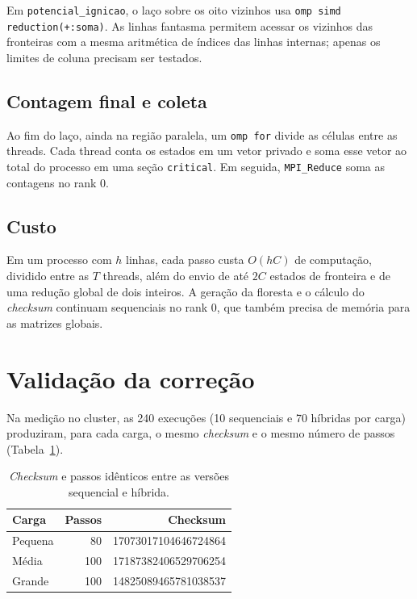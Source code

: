 \documentclass[11pt,a4paper]{article}
\begin{document}
Em \texttt{potencial\_ignicao}, o laço sobre os oito vizinhos usa
\texttt{omp simd reduction(+:soma)}. As linhas fantasma permitem acessar os
vizinhos das fronteiras com a mesma aritmética de índices das linhas
internas; apenas os limites de coluna precisam ser testados.

\subsection{Contagem final e coleta}

Ao fim do laço, ainda na região paralela, um \texttt{omp for} divide as
células entre as threads. Cada thread conta os estados em um vetor privado e
soma esse vetor ao total do processo em uma seção \texttt{critical}. Em seguida, \texttt{MPI\_Reduce} soma as contagens no rank 0.

\subsection{Custo}

Em um processo com $h$ linhas, cada passo custa $O(hC)$ de computação,
dividido entre as $T$ threads, além do envio de até $2C$ estados de
fronteira e de uma redução global de dois inteiros. A geração da floresta e
o cálculo do \emph{checksum} continuam sequenciais no rank 0, que também
precisa de memória para as matrizes globais.

\section{Validação da correção}\label{sec:validacao}

Na medição no cluster, as 240 execuções (10 sequenciais e 70 híbridas por
carga) produziram, para cada carga, o mesmo \emph{checksum} e o mesmo número
de passos (Tabela~\ref{tab:validacao}).

\begin{table}[H]
\centering
\caption{\emph{Checksum} e passos idênticos entre as versões sequencial e híbrida.}
\label{tab:validacao}
\begin{tabular}{lrr}
\toprule
\textbf{Carga} & \textbf{Passos} & \textbf{Checksum} \\
\midrule
Pequena & 80 & 17073017104646724864 \\
Média & 100 & 17187382406529706254 \\
Grande & 100 & 14825089465781038537 \\
\bottomrule
\end{tabular}
\end{table}
\end{document}
